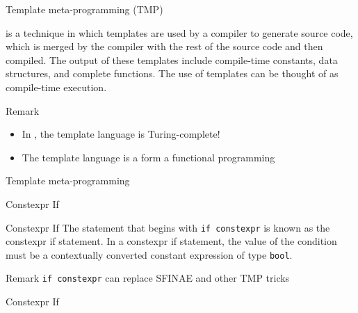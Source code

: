 \begin{frame}{Template meta-programming (TMP)}{}
  \begin{definition}
     is a technique in which templates are used by a compiler to generate source code, which is merged by the compiler with the rest of the source code and then compiled. The output of these templates include compile-time constants, data structures, and complete functions. The use of templates can be thought of as compile-time execution.
  \end{definition}

  \begin{block}{Remark}
    \begin{itemize}
    \item
      In \CCLang, the template language is Turing-complete!
    \item
      The template language is a form a functional programming
    \end{itemize}
  \end{block}
\end{frame}

\begin{frame}{Template meta-programming}{}
  \begin{example}
  \end{example}
\end{frame}



\begin{frame}{Constexpr If}{}
  \begin{block}{Constexpr If}
    The statement that begins with \lstinline!if constexpr! is known as the constexpr if statement.
    In a constexpr if statement, the value of the condition must be a contextually converted constant expression of type \lstinline!bool!.
  \end{block}

  \begin{block}{Remark}
    \lstinline!if constexpr! can replace SFINAE and other TMP tricks
  \end{block}
\end{frame}

\begin{frame}{Constexpr If}{}
  \begin{example}[Constexpr If]
  \end{example}
\end{frame}


